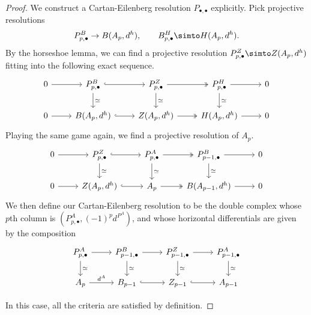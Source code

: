 \documentclass[main.tex]{subfiles}
\begin{document}
\begin{proof}
  We construct a Cartan-Eilenberg resolution $P_{\bullet,\bullet}$ explicitly. Pick projective resolutions
  \begin{equation*}
    P^{B}_{p,\bullet} \to B(A_{p}, d^{h}),\qquad B^{H}_{p,\bullet} \simto H(A_{p}, d^{h}).
  \end{equation*}
  By the horseshoe lemma, we can find a projective resolution $P^{Z}_{p,\bullet} \simto Z(A_{p}, d^{h})$ fitting into the following exact sequence.
  \begin{equation}
    \label{eq:cartan_eilenberg_resolution_ses_1}
    \begin{tikzcd}
      0
      \arrow[r]
      & P^{B}_{p,\bullet}
      \arrow[r, hook]
      \arrow[d, "\simeq"]
      & P^{Z}_{p,\bullet}
      \arrow[r, two heads]
      \arrow[d, "\simeq"]
      & P^{H}_{p,\bullet}
      \arrow[r]
      \arrow[d, "\simeq"]
      & 0
      \\
      0
      \arrow[r]
      & B(A_{p}, d^{h})
      \arrow[r, hook]
      & Z(A_{p}, d^{h})
      \arrow[r, two heads]
      & H(A_{p}, d^{h})
      \arrow[r]
      & 0
    \end{tikzcd}
  \end{equation}
  Playing the same game again, we find a projective resolution of $A_{p}$.
  \begin{equation}
    \label{eq:cartan_eilenberg_resolution_ses_2}
    \begin{tikzcd}
      0
      \arrow[r]
      & P^{Z}_{p,\bullet}
      \arrow[r, hook]
      \arrow[d, "\simeq"]
      & P^{A}_{p,\bullet}
      \arrow[r, two heads]
      \arrow[d, "\simeq"]
      & P^{B}_{p-1,\bullet}
      \arrow[r]
      \arrow[d, "\simeq"]
      & 0
      \\
      0
      \arrow[r]
      & Z(A_{p}, d^{h})
      \arrow[r, hook]
      & A_{p}
      \arrow[r, two heads]
      & B(A_{p-1}, d^{h})
      \arrow[r]
      & 0
    \end{tikzcd}
  \end{equation}
  We then define our Cartan-Eilenberg resolution to be the double complex whose $p$th column is $(P^{A}_{p,\bullet}, (-1)^{p}d^{P^{A}})$, and whose horizontal differentials are given by the composition
  \begin{equation}
    \label{eq:cartan_eilenberg_resolution_horizontal_differentials}
    \begin{tikzcd}
      P^{A}_{p, \bullet}
      \arrow[r]
      \arrow[d, "\simeq"]
      & P^{B}_{p-1, \bullet}
      \arrow[r]
      \arrow[d, "\simeq"]
      & P^{Z}_{p-1, \bullet}
      \arrow[r]
      \arrow[d, "\simeq"]
      & P^{A}_{p-1, \bullet}
      \arrow[d, "\simeq"]
      \\
      A_{p}
      \arrow[r, "d^{A}"]
      & B_{p-1}
      \arrow[r, hook]
      & Z_{p-1}
      \arrow[r, hook]
      & A_{p-1}
    \end{tikzcd}
  \end{equation}

  In this case, all the criteria are satisfied by definition.
\end{proof}
\end{document}
